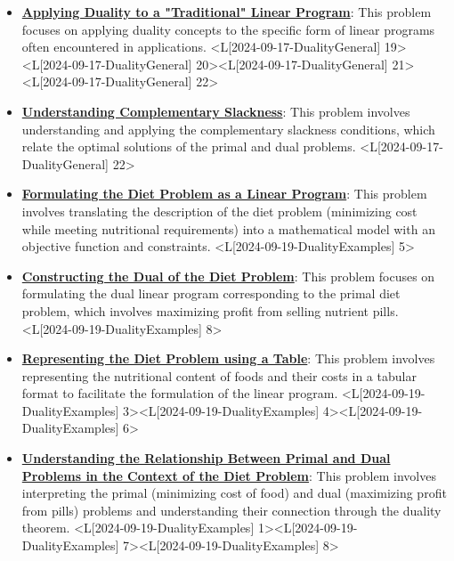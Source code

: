 \documentclass{article}%
\begin{document}
\begin{itemize}[[leftmargin=*]]
\item \href{https://www.math.purdue.edu/~yipn/421/2024-09-17-DualityGeneral.pdf#page=19}{\textbf{Applying Duality to a "Traditional" Linear Program}}: This problem focuses on applying duality concepts to the specific form of linear programs often encountered in applications. <L[2024-09-17-DualityGeneral] 19><L[2024-09-17-DualityGeneral] 20><L[2024-09-17-DualityGeneral] 21><L[2024-09-17-DualityGeneral] 22>%
\item \href{https://www.math.purdue.edu/~yipn/421/2024-09-17-DualityGeneral.pdf#page=22}{\textbf{Understanding Complementary Slackness}}: This problem involves understanding and applying the complementary slackness conditions, which relate the optimal solutions of the primal and dual problems. <L[2024-09-17-DualityGeneral] 22>%
\end{itemize}%
\begin{itemize}[[leftmargin=*]]%
\item \href{https://www.math.purdue.edu/~yipn/421/2024-09-19-DualityExamples.pdf#page=5}{\textbf{Formulating the Diet Problem as a Linear Program}}: This problem involves translating the description of the diet problem (minimizing cost while meeting nutritional requirements) into a mathematical model with an objective function and constraints. <L[2024-09-19-DualityExamples] 5>%
\item \href{https://www.math.purdue.edu/~yipn/421/2024-09-19-DualityExamples.pdf#page=8}{\textbf{Constructing the Dual of the Diet Problem}}: This problem focuses on formulating the dual linear program corresponding to the primal diet problem, which involves maximizing profit from selling nutrient pills. <L[2024-09-19-DualityExamples] 8>%
\item \href{https://www.math.purdue.edu/~yipn/421/2024-09-19-DualityExamples.pdf#page=3}{\textbf{Representing the Diet Problem using a Table}}: This problem involves representing the nutritional content of foods and their costs in a tabular format to facilitate the formulation of the linear program. <L[2024-09-19-DualityExamples] 3><L[2024-09-19-DualityExamples] 4><L[2024-09-19-DualityExamples] 6>%
\item \href{https://www.math.purdue.edu/~yipn/421/2024-09-19-DualityExamples.pdf#page=1}{\textbf{Understanding the Relationship Between Primal and Dual Problems in the Context of the Diet Problem}}: This problem involves interpreting the primal (minimizing cost of food) and dual (maximizing profit from pills) problems and understanding their connection through the duality theorem. <L[2024-09-19-DualityExamples] 1><L[2024-09-19-DualityExamples] 7><L[2024-09-19-DualityExamples] 8>%
\end{itemize}%
\end{document}
